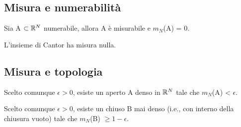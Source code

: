 \documentclass[Completo.tex]{subfiles}
\begin{document}
	\subsection{Misura e numerabilità}
	\begin{Prop}
		Sia A $\sset \bb[R]^{N}$ numerabile, allora A è misurabile e $m_N$(A) = 0.
	\end{Prop}
	\begin{Prop}
		L'insieme di Cantor ha misura nulla.
	\end{Prop}
	\subsection{Misura e topologia}
	\begin{Prop}
		Scelto comunque $\epsilon > 0$, esiste un aperto A denso in $\bb[R]^{N}$ tale che $m_N$(A) < $\epsilon$.
	\end{Prop}
	\begin{Prop}
		Scelto comunque $\epsilon > 0$, esiste un chiuso B mai denso (i.e., con interno della chiusura vuoto) tale che $m_N$(B) $\geq 1-\epsilon$.
	\end{Prop}
\end{document}
